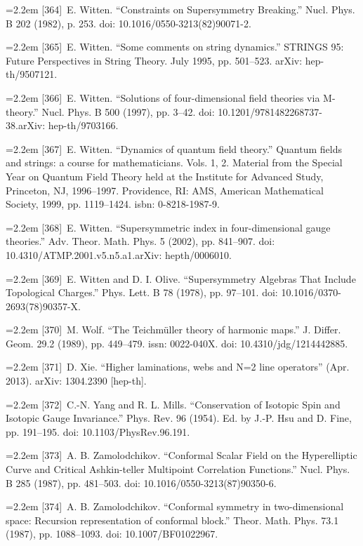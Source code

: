 $$\noindent\hangindent=2.2em [364]\ E. Witten. “Constraints on Supersymmetry Breaking.” Nucl. Phys. B 202 (1982), p. 253. doi: 10.1016/0550-3213(82)90071-2.\par
\noindent\hangindent=2.2em [365]\ E. Witten. “Some comments on string dynamics.” STRINGS 95: Future Perspectives in String Theory. July 1995, pp. 501--523. arXiv: hep-th/9507121.\par
\noindent\hangindent=2.2em [366]\ E. Witten. “Solutions of four-dimensional field theories via M-theory.” Nucl. Phys. B 500 (1997), pp. 3--42. doi: 10.1201/9781482268737-38.arXiv: hep-th/9703166.\par
\noindent\hangindent=2.2em [367]\ E. Witten. “Dynamics of quantum field theory.” Quantum fields and strings: a course for mathematicians. Vols. 1, 2. Material from the Special Year on Quantum Field Theory held at the Institute for Advanced Study, Princeton, NJ, 1996--1997. Providence, RI: AMS, American Mathematical Society, 1999, pp. 1119--1424. isbn: 0-8218-1987-9.\par
\noindent\hangindent=2.2em [368]\ E. Witten. “Supersymmetric index in four-dimensional gauge theories.” Adv. Theor. Math. Phys. 5 (2002), pp. 841--907. doi: 10.4310/ATMP.2001.v5.n5.a1.arXiv: hepth/0006010.\par
\noindent\hangindent=2.2em [369]\ E. Witten and D. I. Olive. “Supersymmetry Algebras That Include Topological Charges.” Phys. Lett. B 78 (1978), pp. 97--101. doi: 10.1016/0370-2693(78)90357-X.\par
\noindent\hangindent=2.2em [370]\ M. Wolf. “The Teichmüller theory of harmonic maps.” J. Differ. Geom. 29.2 (1989), pp. 449--479. issn: 0022-040X. doi: 10.4310/jdg/1214442885.\par
\noindent\hangindent=2.2em [371]\ D. Xie. “Higher laminations, webs and N=2 line operators” (Apr. 2013). arXiv: 1304.2390 [hep-th].\par
\noindent\hangindent=2.2em [372]\ C.-N. Yang and R. L. Mills. “Conservation of Isotopic Spin and Isotopic Gauge Invariance.” Phys. Rev. 96 (1954). Ed. by J.-P. Hsu and D. Fine, pp. 191--195. doi: 10.1103/PhysRev.96.191.\par
\noindent\hangindent=2.2em [373]\ A. B. Zamolodchikov. “Conformal Scalar Field on the Hyperelliptic Curve and Critical Ashkin-teller Multipoint Correlation Functions.” Nucl. Phys. B 285 (1987), pp. 481--503. doi: 10.1016/0550-3213(87)90350-6.\par
\noindent\hangindent=2.2em [374]\ A. B. Zamolodchikov. “Conformal symmetry in two-dimensional space: Recursion representation of conformal block.” Theor. Math. Phys. 73.1 (1987), pp. 1088--1093. doi: 10.1007/BF01022967.\par
\endgroup
